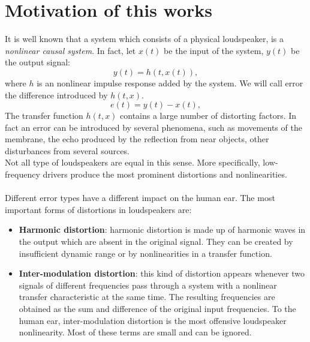 \section{Motivation of this works}
It is well known that a system which consists of a physical loudspeaker, is a \textit{nonlinear causal system}. In fact, let $x(t)$ be the input of the system, $y(t)$ be the output signal:
\[ y(t) = h(t, x(t)), \]
where $h$ is an nonlinear impulse response added by the system. We will call error the difference introduced by $h(t,x)$.
\[ e(t) = y(t)-x(t),\]
The transfer function $h(t, x)$ contains a large number of distorting factors. In fact an error can be introduced by several phenomena, such as movements of the membrane, the echo produced by the reflection from near objects, other disturbances from several sources.\\
Not all type of loudspeakers are equal in this sense. More specifically, low-frequency drivers produce the most prominent distortions and nonlinearities. \cite{loudspeakerchar} \\\\
Different error types have a different impact on the human ear. The most important forms of distortions in loudspeakers are:
\begin{itemize}
	\item \textbf{Harmonic distortion}: harmonic distortion is made up of harmonic waves in the output which are absent in the original signal.  They can be created by insufficient dynamic range or by nonlinearities in a transfer function.
	\item \textbf{Inter-modulation distortion}: this kind of distortion appears whenever two signals of different frequencies pass through a system with a nonlinear transfer characteristic at the same time. The resulting frequencies are obtained as the sum and difference of the original input frequencies. To the human ear, inter-modulation distortion is the most offensive loudspeaker nonlinearity. Most of these terms are small and can be ignored.\cite{audiosystem}
\end{itemize}

